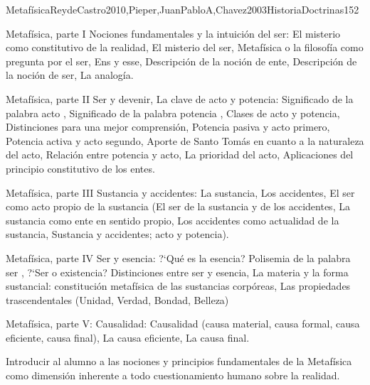 \begin{syllabus}
\begin{unit}{Metafísica}{ReydeCastro2010,Pieper,JuanPabloA,Chavez2003HistoriaDoctrinas}{15}{2}
\begin{topics}
	\item Metafísica, parte I  Nociones fundamentales y la intuición del ser: El misterio como constitutivo de la realidad, El misterio del ser, Metafísica o la filosofía como pregunta por el ser, Ens y esse, Descripción de la noción de ente, Descripción de la noción de ser, La analogía.
	\item Metafísica, parte II  Ser y devenir, La clave de acto y potencia: Significado de la palabra  acto , Significado de la palabra  potencia , Clases de acto y potencia, Distinciones para una mejor comprensión, Potencia pasiva y acto primero, Potencia activa y acto segundo, Aporte de Santo Tomás en cuanto a la naturaleza del acto, Relación entre potencia y acto, La prioridad del acto, Aplicaciones del principio constitutivo de los entes.
	\item Metafísica, parte III  Sustancia y accidentes: La sustancia, Los accidentes, El ser como acto propio de la sustancia (El ser de la sustancia y de los accidentes, La sustancia como ente en sentido propio, Los accidentes como actualidad de la sustancia, Sustancia y accidentes; acto y potencia).
	\item Metafísica, parte IV  Ser y esencia: ?`Qué es la esencia? Polisemia de la palabra  ser , ?`Ser o existencia? Distinciones entre ser y esencia, La materia y la forma sustancial: constitución metafísica de las sustancias corpóreas, Las propiedades trascendentales (Unidad, Verdad, Bondad, Belleza)
	\item Metafísica, parte V: Causalidad: Causalidad (causa material, causa formal, causa eficiente, causa final), La causa eficiente, La causa final.
\end{topics}

\begin{unitgoals}
	\item Introducir al alumno a las nociones y principios fundamentales de la Metafísica como dimensión inherente a todo cuestionamiento humano sobre la realidad.
\end{unitgoals}
\end{unit}



\begin{coursebibliography}
\end{coursebibliography}

\end{syllabus}
